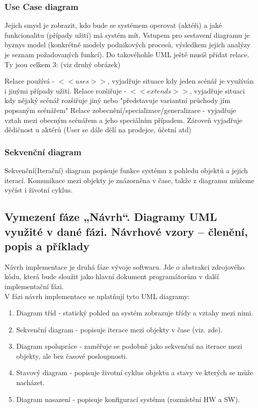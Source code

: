 \documentclass[10pt,a4paper]{article}
\begin{document}
\subsubsection{Use Case diagram}
Jejich smysl je zobrazit, kdo bude se systémem operovat (aktéři) a jaké funkcionalitu (případy užití) má systém mít. Vstupem pro sestavení diagramu je byznys model (konkrétně modely podnikových procesů, výsledkem jejich analýzy je seznam požadovaných funkcí).
Do takovéhohle UML ještě musíš přidat relace. Ty jsou celkem 3: (viz druhý obrázek)

Relace používá - $<<uses>>$, vyjadřuje situace kdy jeden scénář je využíván i jinými případy užití.
Relace rozšiřuje - $<<extends>>$, vyjadřuje situaci kdy nějaký scénář rozšiřuje jiný nebo "představuje variantní průchody jím popsaným scénářem"
Relace zobecnění/specializace/generalizace - vyjadřuje vztah mezi obecným scénářem a jeho speciálním případem. Zároveň vyjadřuje dědičnost u aktérů (User se dále dělí na prodejce, účetní atd)


\subsubsection{Sekvenční diagram}
Sekvenční(Iterační) diagram popisuje funkce systému z pohledu objektů a jejich iterací. Komunikace mezi objekty je znázorněna v čase, takže z diagramu můžeme vyčíst i životní cyklus. 

\subsection{Vymezení fáze „Návrh“. Diagramy UML využité v dané fázi. Návrhové vzory – členění, popis a příklady}
Návrh implementace je druhá fáze vývoje softwaru. Jde o abstrakci zdrojového kódu, která bude sloužit jako hlavní dokument programátorům v další implementační fázi.\\

V fázi návrh implementace se uplatňují tyto UML diagramy:
\begin{enumerate}
\item Diagram tříd -  statický pohled na systém zobrazuje třídy a vztahy mezi nimi. 
\item Sekvenční diagram - popisuje iterace mezi objekty v čase (viz. zde).
\item Diagram spolupráce - zaměřuje se podobně jako sekvenční na iterace mezi objekty, ale bez časové posloupnosti.
\item Stavový diagram - popisuje životní cyklus objektu a stavy ve kterých se může nacházet.
\item Diagram nasazení - popisuje konfigurací systému  (rozmístění HW a SW).
\end{enumerate}
\end{document}
